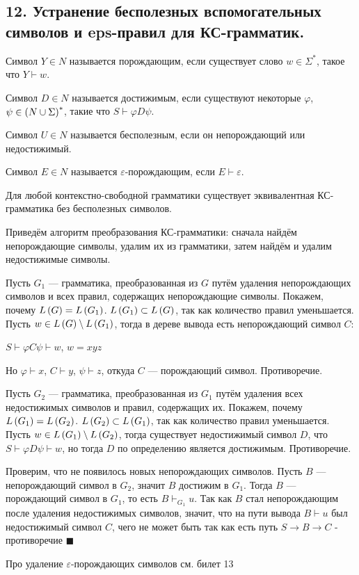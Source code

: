 \subsection{12. Устранение бесполезных вспомогательных символов и eps-правил для КС-грамматик.}


\Def Символ $Y \in N$ называется порождающим, если существует слово $w \in \Sigma^*$, такое что $Y \vdash w$.

\Def Символ $D \in N$ называется достижимым, если существуют некоторые $\varphi$, $\psi \in \left({N \cup \Sigma}\right)^*$, такие что $S \vdash \varphi D \psi$.

\Def Символ $U \in N$ называется бесполезным, если он непорождающий или недостижимый.

\Def Символ $E \in N$ называется $\varepsilon$-порождающим, если $E \vdash \varepsilon$.

\Statement Для любой контекстно-свободной грамматики существует эквивалентная КС-грамматика без бесполезных символов.

\Proof Приведём алгоритм преобразования КС-грамматики: сначала найдём непорождающие символы, удалим их из грамматики, затем найдём и удалим недостижимые символы.

Пусть $G_1$ — грамматика, преобразованная из $G$ путём удаления непорождающих символов и всех правил, содержащих непорождающие символы. Покажем, почему $L \left({G}\right) = L \left({G_1}\right)$. $L \left({G_1}\right) \subset L \left({G}\right)$, так как количество правил уменьшается. Пусть $w \in L \left({G}\right) \setminus L \left({G_1}\right)$, тогда в дереве вывода есть непорождающий символ $C$:

\begin{center}
    $S \vdash \varphi C \psi \vdash w$, $w = xyz$
\end{center}

Но $\varphi \vdash x$, $C \vdash y$, $\psi \vdash z$, откуда $C$ — порождающий символ. Противоречие.

Пусть $G_2$ — грамматика, преобразованная из $G_1$ путём удаления всех недостижимых символов и правил, содержащих их. Покажем, почему $L \left({G_1}\right) = L \left({G_2}\right)$. $L \left({G_2}\right) \subset L \left({G_1}\right)$, так как количество правил уменьшается. Пусть $w \in L \left({G_1}\right) \setminus L \left({G_2}\right)$, тогда существует недостижимый символ $D$, что $S \vdash \varphi D \psi \vdash w$, но тогда $D$ по определению является достижимым. Противоречие.

Проверим, что не появилось новых непорождающих символов. Пусть $B$ — непорождающий символ в $G_2$, значит $B$ достижим в $G_1$. Тогда $B$ — порождающий символ в $G_1$, то есть $B \vdash_{G_1} u$. Так как $B$ стал непорождающим после удаления недостижимых символов, значит, что на пути вывода $B\vdash u$ был недостижимый символ $C$, чего не может быть так как есть путь $S \rightarrow B \rightarrow C$ - противоречие $\blacksquare$


Про удаление $\varepsilon$-порождающих символов см. билет 13